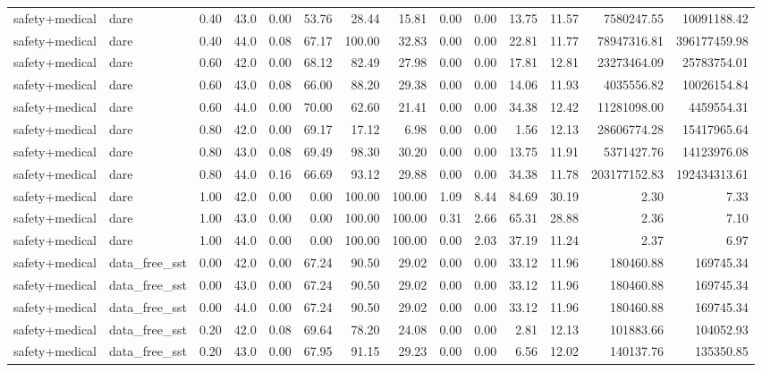 \documentclass{article}
\begin{document}
\begin{table}[H]
{\begin{tabular}{llllrrrrrrrrrr}
safety+medical & dare & 0.40 & 43.0 & 0.00 & 53.76 & 28.44 & 15.81 & 0.00 & 0.00 & 13.75 & 11.57 & 7580247.55 & 10091188.42 \\
safety+medical & dare & 0.40 & 44.0 & 0.08 & 67.17 & 100.00 & 32.83 & 0.00 & 0.00 & 22.81 & 11.77 & 78947316.81 & 396177459.98 \\
safety+medical & dare & 0.60 & 42.0 & 0.00 & 68.12 & 82.49 & 27.98 & 0.00 & 0.00 & 17.81 & 12.81 & 23273464.09 & 25783754.01 \\
safety+medical & dare & 0.60 & 43.0 & 0.08 & 66.00 & 88.20 & 29.38 & 0.00 & 0.00 & 14.06 & 11.93 & 4035556.82 & 10026154.84 \\
safety+medical & dare & 0.60 & 44.0 & 0.00 & 70.00 & 62.60 & 21.41 & 0.00 & 0.00 & 34.38 & 12.42 & 11281098.00 & 4459554.31 \\
safety+medical & dare & 0.80 & 42.0 & 0.00 & 69.17 & 17.12 & 6.98 & 0.00 & 0.00 & 1.56 & 12.13 & 28606774.28 & 15417965.64 \\
safety+medical & dare & 0.80 & 43.0 & 0.08 & 69.49 & 98.30 & 30.20 & 0.00 & 0.00 & 13.75 & 11.91 & 5371427.76 & 14123976.08 \\
safety+medical & dare & 0.80 & 44.0 & 0.16 & 66.69 & 93.12 & 29.88 & 0.00 & 0.00 & 34.38 & 11.78 & 203177152.83 & 192434313.61 \\
safety+medical & dare & 1.00 & 42.0 & 0.00 & 0.00 & 100.00 & 100.00 & 1.09 & 8.44 & 84.69 & 30.19 & 2.30 & 7.33 \\
safety+medical & dare & 1.00 & 43.0 & 0.00 & 0.00 & 100.00 & 100.00 & 0.31 & 2.66 & 65.31 & 28.88 & 2.36 & 7.10 \\
safety+medical & dare & 1.00 & 44.0 & 0.00 & 0.00 & 100.00 & 100.00 & 0.00 & 2.03 & 37.19 & 11.24 & 2.37 & 6.97 \\
safety+medical & data\_free\_sst & 0.00 & 42.0 & 0.00 & 67.24 & 90.50 & 29.02 & 0.00 & 0.00 & 33.12 & 11.96 & 180460.88 & 169745.34 \\
safety+medical & data\_free\_sst & 0.00 & 43.0 & 0.00 & 67.24 & 90.50 & 29.02 & 0.00 & 0.00 & 33.12 & 11.96 & 180460.88 & 169745.34 \\
safety+medical & data\_free\_sst & 0.00 & 44.0 & 0.00 & 67.24 & 90.50 & 29.02 & 0.00 & 0.00 & 33.12 & 11.96 & 180460.88 & 169745.34 \\
safety+medical & data\_free\_sst & 0.20 & 42.0 & 0.08 & 69.64 & 78.20 & 24.08 & 0.00 & 0.00 & 2.81 & 12.13 & 101883.66 & 104052.93 \\
safety+medical & data\_free\_sst & 0.20 & 43.0 & 0.00 & 67.95 & 91.15 & 29.23 & 0.00 & 0.00 & 6.56 & 12.02 & 140137.76 & 135350.85 \\

\end{tabular}}
\end{table}
\end{document}
